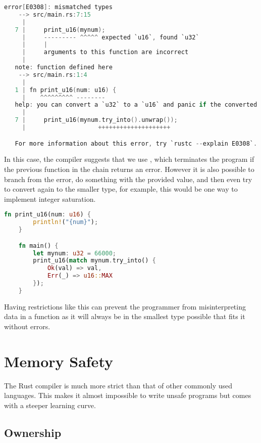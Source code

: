 \begin{lstlisting}[language=C,frame=single,float=!ht,label={lst:rust-reverse-conv-error},caption={Rust Type Conversion Error}]
    error[E0308]: mismatched types
    --> src/main.rs:7:15
     |
   7 |     print_u16(mynum);
     |     --------- ^^^^^ expected `u16`, found `u32`
     |     |
     |     arguments to this function are incorrect
     |
   note: function defined here
    --> src/main.rs:1:4
     |
   1 | fn print_u16(num: u16) {
     |    ^^^^^^^^^ --------
   help: you can convert a `u32` to a `u16` and panic if the converted value doesn't fit
     |
   7 |     print_u16(mynum.try_into().unwrap());
     |                    ++++++++++++++++++++

   For more information about this error, try `rustc --explain E0308`.
\end{lstlisting}

In this case, the compiler suggests that we use , which terminates the program if the previous function in the chain returns an error. However it is also possible to branch from the error, do something with the provided value, and then even try to convert again to the smaller type, for example, this would be one way to implement integer saturation.

\begin{lstlisting}[language=Rust,frame=single,float=!ht,style=customrust,label={lst:rust-cap-integer},caption={Branching from an Error}]
    fn print_u16(num: u16) {
        println!("{num}");
    }

    fn main() {
        let mynum: u32 = 66000;
        print_u16(match mynum.try_into() {
            Ok(val) => val,
            Err(_) => u16::MAX
        });
    }
\end{lstlisting}

Having restrictions like this can prevent the programmer from misinterpreting data in a function as it will always be in the smallest type possible that fits it without errors.

\section{Memory Safety}

The Rust compiler is much more strict than that of other commonly used languages. This makes it almost impossible to write unsafe programs but comes with a steeper learning curve.

\subsection{Ownership}

